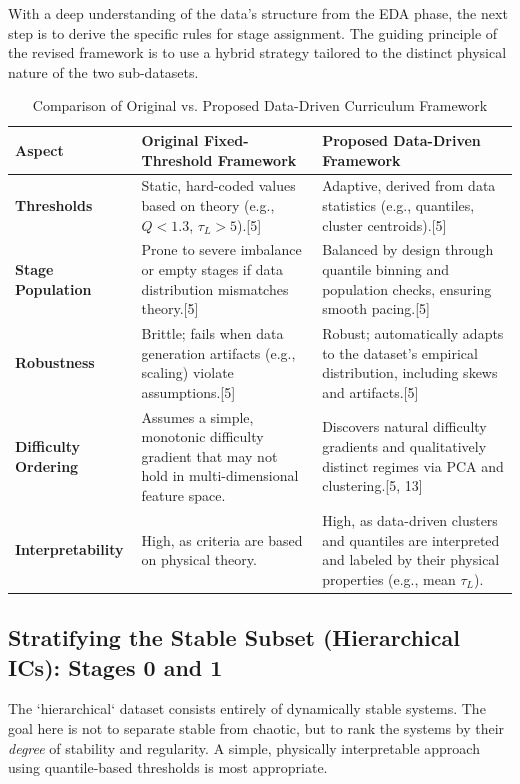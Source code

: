 With a deep understanding of the data's structure from the EDA phase, the next step is to derive the specific rules for stage assignment. The guiding principle of the revised framework is to use a hybrid strategy tailored to the distinct physical nature of the two sub-datasets.

\begin{table}[H]
\centering
\caption{Comparison of Original vs. Proposed Data-Driven Curriculum Framework}
\label{tab:framework_comparison}
\begin{tabular}{@{}p{2.5cm}p{5.5cm}p{5.5cm}@{}}
\toprule
\textbf{Aspect} & \textbf{Original Fixed-Threshold Framework} & \textbf{Proposed Data-Driven Framework} \\ \midrule
\textbf{Thresholds} & Static, hard-coded values based on theory (e.g., $Q<1.3$, $\tau_L>5$).[5] & Adaptive, derived from data statistics (e.g., quantiles, cluster centroids).[5] \\
\textbf{Stage Population} & Prone to severe imbalance or empty stages if data distribution mismatches theory.[5] & Balanced by design through quantile binning and population checks, ensuring smooth pacing.[5] \\
\textbf{Robustness} & Brittle; fails when data generation artifacts (e.g., scaling) violate assumptions.[5] & Robust; automatically adapts to the dataset's empirical distribution, including skews and artifacts.[5] \\
\textbf{Difficulty Ordering} & Assumes a simple, monotonic difficulty gradient that may not hold in multi-dimensional feature space. & Discovers natural difficulty gradients and qualitatively distinct regimes via PCA and clustering.[5, 13] \\
\textbf{Interpretability} & High, as criteria are based on physical theory. & High, as data-driven clusters and quantiles are interpreted and labeled by their physical properties (e.g., mean $\tau_L$). \\ \bottomrule
\end{tabular}
\end{table}

\subsection{Stratifying the Stable Subset (Hierarchical ICs): Stages 0 and 1}

The `hierarchical` dataset consists entirely of dynamically stable systems. The goal here is not to separate stable from chaotic, but to rank the systems by their \textit{degree} of stability and regularity. A simple, physically interpretable approach using quantile-based thresholds is most appropriate.

